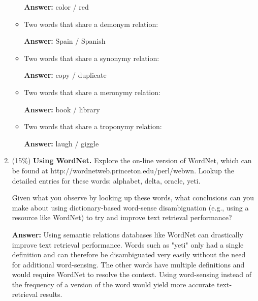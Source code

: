 \documentclass[11pt]{article}
\begin{document}
\begin{enumerate}
\begin{itemize}
                \textbf{Answer:} color / red

          \item Two words that share a demonym relation:

                \textbf{Answer:} Spain / Spanish

          \item Two words that share a synonymy relation:

                \textbf{Answer:} copy / duplicate

          \item Two words that share a meronymy relation:

                \textbf{Answer:} book / library

          \item Two words that share a troponymy relation:

                \textbf{Answer:} laugh / giggle

        \end{itemize}

  \item (15\%) \textbf{Using WordNet.} Explore the on-line version of WordNet, which can be found at http://wordnetweb.princeton.edu/perl/webwn. Lookup the detailed entries for these words: alphabet, delta, oracle, yeti.

        Given what you observe by looking up these words, what conclusions can you make about using dictionary-based word-sense disambiguation (e.g., using a resource like WordNet) to try and improve text retrieval performance?

        \textbf{Answer:} Using semantic relations databases like WordNet can drastically improve text retrieval performance. Words such as "yeti" only had a single definition and can therefore be disambiguated very easily without the need for additional word-sensing. The other words have multiple definitions and would require WordNet to resolve the context. Using word-sensing instead of the frequency of a version of the word would yield more accurate text-retrieval results.

\end{enumerate}
\end{document}
